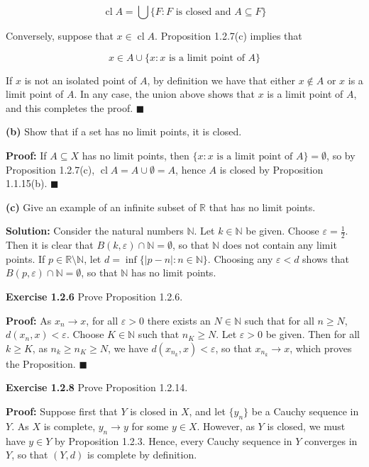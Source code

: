 \documentclass{article}
\DeclareMathOperator{\cl}{cl}
\begin{document}
\begin{equation*}
    \cl A=\bigcup \{F: \text{$F$ is closed and $A\subseteq F$}\}
\end{equation*}

Conversely, suppose that $x\in \cl A$. Proposition 1.2.7(c) implies that 

\begin{equation*}
    x\in A\cup \{x : \text{$x$ is a limit point of $A$}\}
\end{equation*}

If $x$ is not an isolated point of $A$, by definition we have that either $x\notin A$ or $x$ is a limit point of $A$. In any case, the union above shows that $x$ is a limit point of $A$, and this completes the proof. $\blacksquare$
\begin{tcolorbox}
\textbf{(b)} Show that if a set has no limit points, it is closed.
\end{tcolorbox}
\textbf{Proof:} If $A\subseteq X$ has no limit points, then $ \{x : \text{$x$ is a limit point of $A$} \}=\emptyset$, so by Proposition 1.2.7(c), $\cl A=A\cup \emptyset =A$, hence $A$ is closed by Proposition 1.1.15(b). $\blacksquare$
\begin{tcolorbox}
\textbf{(c)} Give an example of an infinite subset of $\mathbb{R}$ that has no limit points.
\end{tcolorbox}
\textbf{Solution:} Consider the natural numbers $\mathbb{N}$. Let $k\in \mathbb{N}$ be given. Choose $\varepsilon=\frac{1}{2}$. Then it is clear that $B(k,\varepsilon )\cap \mathbb{N}=\emptyset$, so that $\mathbb{N}$ does not contain any limit points. If $p\in \mathbb{R}\setminus \mathbb{N}$, let $d=\inf\{|p-n|:n\in \mathbb{N}\}$. Choosing any $\varepsilon <d$ shows that $B(p,\varepsilon)\cap \mathbb{N}=\emptyset$, so that $\mathbb{N}$ has no limit points.
\begin{tcolorbox}
\textbf{Exercise 1.2.6} Prove Proposition 1.2.6.
\end{tcolorbox}
\textbf{Proof:} As $x_n\to x$, for all $\varepsilon>0 $ there exists an $N\in \mathbb{N}$ such that for all $n\geq N$, $d(x_n,x)<\varepsilon$. Choose $K\in \mathbb{N}$ such that $n_K\geq N$. Let $\varepsilon >0$ be given. Then for all $k\geq K$, as $n_k\geq n_K\geq N$, we have $d(x_{n_k},x)<\varepsilon$, so that $x_{n_k}\to x$, which proves the Proposition. $\blacksquare$

\begin{tcolorbox}
\textbf{Exercise 1.2.8} Prove Proposition 1.2.14.
\end{tcolorbox}
\textbf{Proof:} Suppose first  that $Y$ is closed in $X$, and let $\{y_n\}$ be a Cauchy sequence in $Y$. As $X$ is complete, $y_n\to y$ for some $y\in X$. However, as $Y$ is closed, we must have $y\in Y$ by Proposition 1.2.3. Hence, every Cauchy sequence in $Y$ converges in $Y$, so that $(Y,d)$ is complete by definition.
\end{document}
